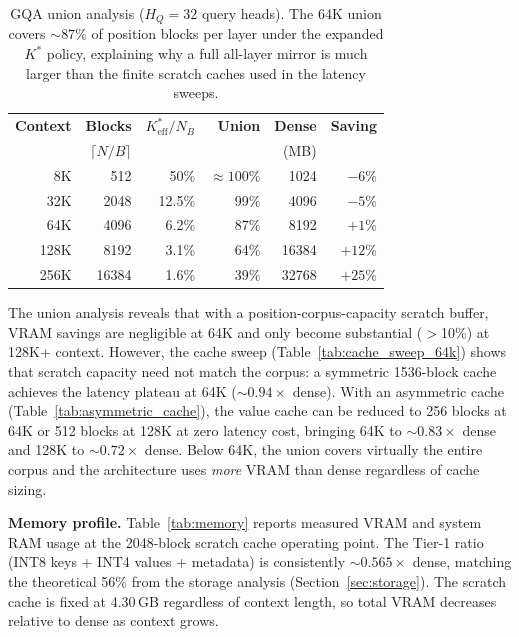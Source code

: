 \documentclass[10pt,twocolumn,a4paper]{article}
\theoremstyle{definition}
\theoremstyle{remark}
\begin{document}
\begin{table}[!t]
\centering
\caption{GQA union analysis ($H_Q{=}32$ query heads).  The 64K union covers ${\sim}87\%$ of position blocks per layer under the expanded $K^*$ policy, explaining why a full all-layer mirror is much larger than the finite scratch caches used in the latency sweeps.}
\label{tab:union}
\small
\begin{tabular}{rrrrrr}
\toprule
\textbf{Context} & \textbf{Blocks} & \textbf{$K^*_{\mathrm{eff}}/N_B$} & \textbf{Union} & \textbf{Dense} & \textbf{Saving} \\
 & $\lceil N/B \rceil$ & & & (MB) & \\
\midrule
8K   & 512   & 50\%    & ${\approx}100\%$  & 1024  & $-6\%$ \\
32K  & 2048  & 12.5\%  & 99\%    & 4096  & $-5\%$ \\
\rowcolor[gray]{0.92}
64K  & 4096  & 6.2\%   & 87\%    & 8192  & $+1\%$ \\
128K & 8192  & 3.1\%   & 64\%    & 16384 & $+12\%$ \\
256K & 16384 & 1.6\%   & 39\%    & 32768 & $+25\%$ \\
\bottomrule
\end{tabular}
\end{table}

The union analysis reveals that with a position-corpus-capacity scratch buffer, VRAM savings are negligible at 64K and only become substantial ($>$10\%) at 128K+ context.  However, the cache sweep (Table~\ref{tab:cache_sweep_64k}) shows that scratch capacity need not match the corpus: a symmetric 1536-block cache achieves the latency plateau at 64K (${\sim}0.94\times$ dense).  With an asymmetric cache (Table~\ref{tab:asymmetric_cache}), the value cache can be reduced to 256 blocks at 64K or 512 blocks at 128K at zero latency cost, bringing 64K to ${\sim}0.83\times$ dense and 128K to ${\sim}0.72\times$ dense.  Below 64K, the union covers virtually the entire corpus and the architecture uses \emph{more} VRAM than dense regardless of cache sizing.

\textbf{Memory profile.}  Table~\ref{tab:memory} reports measured VRAM and system RAM usage at the 2048-block scratch cache operating point.  The Tier-1 ratio (INT8 keys + INT4 values + metadata) is consistently ${\sim}0.565\times$ dense, matching the theoretical 56\% from the storage analysis (Section~\ref{sec:storage}).  The scratch cache is fixed at 4.30\,GB regardless of context length, so total VRAM decreases relative to dense as context grows.
\end{document}
